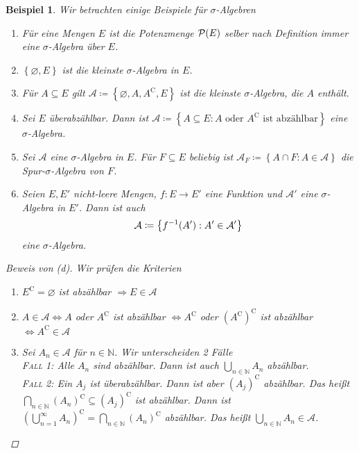 \documentclass[11pt, twoside, a4paper]{article}
\theoremstyle{plain}
\newtheorem{beispiel}[blockelement]{Beispiel}
\numberwithin{equation}{subsection}
\newcommand{\set}[1]{\left\{#1\right\}}
\newcommand{\pair}[1]{\left(#1\right)}
\newcommand{\of}[1]{\mathopen{}\mathclose{}\bgroup\left(#1\aftergroup\egroup\right)}
\newcommand{\equivalent}[0]{\Leftrightarrow{}}
\newcommand{\impl}[0]{\Rightarrow{}}
\renewcommand{\emptyset}{\varnothing}
\newcommand{\comp}[1]{{#1}^{\mathrm{C}}}
\newcommand{\N}{\mathbb{N}}
\begin{document}
    \begin{beispiel}
        Wir betrachten einige Beispiele für $\sigma$-Algebren
        \begin{enumerate}[label=(\alph*)]
            \item Für eine Mengen $E$ ist die Potenzmenge $\mathcal{P}\of{E}$ selber nach Definition immer eine $\sigma$-Algebra über $E$.
            \item $\set{\emptyset, E}$ ist die kleinste $\sigma$-Algebra in $E$.
            \item Für $A \subseteq E$ gilt $\mathcal{A} \coloneqq \set{\emptyset, A, \comp{A}, E}$ ist die kleinste $\sigma$-Algebra, die $A$ enthält.
            \item Sei $E$ überabzählbar. Dann ist $\mathcal{A} \coloneqq \set{A\subseteq E: A \text{ oder }\comp{A}\text{ ist abzählbar}}$ eine $\sigma$-Algebra.
            \item Sei $\mathcal{A}$ eine $\sigma$-Algebra in $E$. Für $F\subseteq E$ beliebig ist $\mathcal{A}_F \coloneqq \set{A \cap F: A\in\mathcal{A}}$ die Spur-$\sigma$-Algebra von $F$.
            \item Seien $E, E'$ nicht-leere Mengen, $f: E\to E'$ eine Funktion und $\mathcal{A}'$ eine $\sigma$-Algebra in $E'$. Dann ist auch
            \begin{align*}
                \mathcal{A} \coloneqq \set{f^{-1}\of{A'}: A'\in\mathcal{A}'}
            \end{align*}
            eine $\sigma$-Algebra.
        \end{enumerate}

        \begin{proof}[Beweis von (d)]
            Wir prüfen die Kriterien
            \begin{enumerate}[label=($\Sigma_{\arabic*}$)]
                \item $\comp{E} = \emptyset$ ist abzählbar $\impl E\in\mathcal{A}$
                \item $A\in\mathcal{A} \equivalent A$ oder $\comp{A}$ ist abzählbar $\equivalent \comp{A}$ oder $\comp{\pair{\comp{A}}}$ ist abzählbar $\equivalent \comp{A} \in\mathcal{A}$
                \item Sei $A_n \in\mathcal{A}$ für $n\in\N$. Wir unterscheiden 2 Fälle\\
                \textsc{Fall 1}: Alle $A_n$ sind abzählbar. Dann ist auch $\bigcup_{n\in\N} A_n$ abzählbar.\\
                \textsc{Fall 2}: Ein $A_j$ ist überabzählbar. Dann ist aber $\comp{\pair{A_j}}$ abzählbar. Das heißt $\bigcap_{n\in\N} \comp{\pair{A_n}} \subseteq \comp{\pair{A_j}}$ ist abzählbar. Dann ist $\comp{\pair{\bigcup_{n=1}^{\infty} A_n}} = \bigcap_{n\in\N} \comp{\pair{A_n}}$ abzählbar. Das heißt $\bigcup_{n\in\N} A_n \in\mathcal{A}$.
            \end{enumerate}
        \end{proof}
    \end{beispiel}
\end{document}
